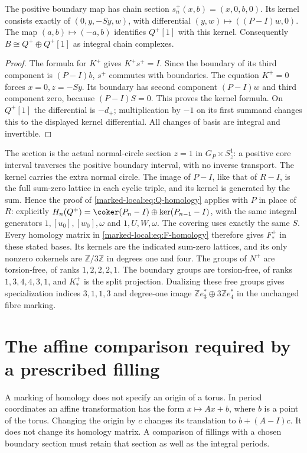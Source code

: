 \begin{proposition}\label{marked-local:prop:positive-splitting}
The positive boundary map has chain section
$s^+_n(x,b)=(x,0,b,0)$. Its kernel consists exactly of
$(0,y,-Sy,w)$, with differential $(y,w)\mapsto((P-I)w,0)$.
The map $(a,b)\mapsto(-a,b)$ identifies $Q^+[1]$ with this kernel.
Consequently $B\cong Q^+\oplus Q^+[1]$ as integral chain complexes.
\end{proposition}
\begin{proof}
The formula for $K^+$ gives $K^+s^+=I$. Since the boundary of
its third component is $(P-I)b$, $s^+$ commutes with boundaries.
The equation $K^+=0$ forces $x=0,z=-Sy$. Its boundary has
second component $(P-I)w$ and third component zero, because
$(P-I)S=0$. This proves the kernel formula. On $Q^+[1]$ the
differential is $-d_+$; multiplication by $-1$ on its first
summand changes this to the displayed kernel differential.
All changes of basis are integral and invertible.
\end{proof}

The section is the actual normal-circle section $z=1$ in
$G_P\times S^1_z$: a positive core interval traverses the positive
boundary interval, with no inverse transport. The kernel carries
the extra normal circle. The image of $P-I$, like that of $R-I$,
is the full sum-zero lattice in each cyclic triple, and its kernel
is generated by the sum. Hence the proof of
\eqref{marked-local:eq:Q-homology} applies with $P$ in place of $R$: explicitly
$H_n(Q^+)=\coker(P_n-I)\oplus\ker(P_{n-1}-I)$, with the same
integral generators $1,[u_0],[w_0],\omega$ and $1,U,W,\omega$.
The covering uses exactly the same $S$. Every homology matrix in
\eqref{marked-local:eq:F-homology} therefore gives $F^+_*$ in these stated bases.
Its kernels are the indicated sum-zero lattices, and its only
nonzero cokernels are $\mathbb Z/3\mathbb Z$ in degrees one and four.
The groups of $N^+$ are torsion-free, of ranks $1,2,2,2,1$.
The boundary groups are torsion-free, of ranks $1,3,4,4,3,1$,
and $K^+_*$ is the split projection. Dualizing these free groups
gives specialization indices $3,1,1,3$ and degree-one image
$\mathbb Ze_3^*\oplus3\mathbb Ze_4^*$ in the unchanged fibre marking.

\section{The affine comparison required by a prescribed filling}

A marking of homology does not specify an origin of a torus.
In period coordinates an affine transformation has the form
$x\mapsto Ax+b$, where $b$ is a point of the torus. Changing the
origin by $c$ changes its translation to $b+(A-I)c$.
It does not change its homology matrix. A comparison of fillings
with a chosen boundary section must retain that section as well
as the integral periods.

